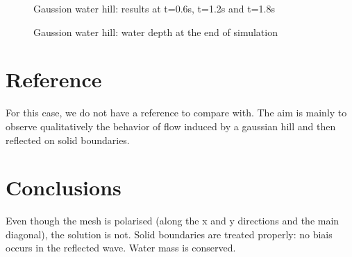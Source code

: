 \begin{figure}
\caption{Gaussion water hill:  results at t=0.6s, t=1.2s and t=1.8s} \label{fig:gouttedo_evol2}
\end{figure}


\begin{figure}
\caption{Gaussion water hill: water depth at the end of simulation} \label{fig:gouttedo_end}
\end{figure}

%
%
%

\section{Reference}
For this case, we do not have a reference to compare with. The aim is mainly to
observe qualitatively the behavior of flow induced by a gaussian hill and then
reflected on solid boundaries.

\section{ Conclusions}

Even though the mesh is polarised (along the x and y directions and the main
diagonal), the solution is not.
Solid boundaries are treated properly: no biais occurs in the reflected wave.
Water mass is conserved.


